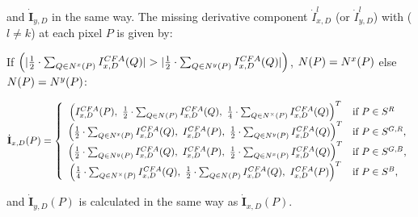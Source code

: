 \documentclass[twoside]{article}
\begin{document}
\noindent and $\dot{\textbf{I}}_{y,D}$ in the same way. The missing derivative component $\dot{I}_{x,D}^l$ (or $\dot{I}_{y,D}^l$) with ($l \neq k$) at each pixel $P$ is given by:	




If $\left(|\frac{1}{2}\cdot\sum_{Q \in \N{x}(P)} I_{x,D}^{CFA}(Q)|>|\frac{1}{2}\cdot\sum_{Q \in \N{y}(P)} I_{x,D}^{CFA}(Q)|\right)$, $N(P)=N^{x}(P)$ else  $N(P)=N^{y}(P)$:

\begin{equation}
\dot{\textbf{I}}_{x,D}(P) = \left\lbrace
\begin{array}{cl}
\left( I_{x,D}^{CFA}(P), ~\frac{1}{2}\cdot\sum_{Q \in N^{}(P)} I_{x,D}^{CFA}(Q),~\frac{1}{4}\cdot\sum_{Q \in N^{\times}(P)} I_{x,D}^{CFA}(Q) \right)^T & \text{if $P \in S^R$} \\
\left( \frac{1}{2}\cdot\sum_{Q \in N^{x}(P)} I_{x,D}^{CFA}(Q),~I_{x,D}^{CFA}(P),~\frac{1}{2}\cdot\sum_{Q \in N^{y}(P)} I_{x,D}^{CFA}(Q) \right)^T & \text{if $P \in S^{G,R}$,}\\
\left( \frac{1}{2}\cdot\sum_{Q \in N^{y}(P)} I_{x,D}^{CFA}(Q),~I_{x,D}^{CFA}(P),~\frac{1}{2}\cdot\sum_{Q \in N^{x}(P)} I_{x,D}^{CFA}(Q) \right)^T & \text{if $P \in S^{G,B}$,}\\
\left( \frac{1}{4}\cdot\sum_{Q \in N^{\times}(P)} I_{x,D}^{CFA}(Q),~\frac{1}{2}\cdot\sum_{Q \in N^{}(P)} I_{x,D}^{CFA}(Q),~I_{x,D}^{CFA}(P) \right)^T & \text{if $P \in S^B$,}
\end{array}\right.
\label{eq:I^D1_p_x_full}
\end{equation}







\noindent and $\dot{\textbf{I}}_{y,D}(P)$ is calculated in the same way as $\dot{\textbf{I}}_{x,D}(P)$.  
\end{document}
